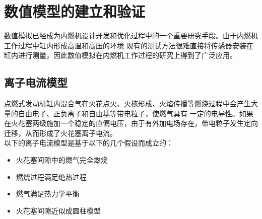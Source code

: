 \chapter{数值模型的建立和验证}
数值模拟已经成为内燃机设计开发和优化过程中的一个重要研究手段。由于内燃机工作过程中缸内形成高温和高压的环境
现有的测试方法很难直接将传感器安装在缸内进行测量，因此数值模拟在内燃机工作过程的研究上得到了广泛应用。
\section{离子电流模型}
点燃式发动机缸内混合气在火花点火、火核形成、火焰传播等燃烧过程中会产生大量的自由电子、正负离子和自由基等带电粒子，使燃气具有
一定的电导性。如果在火花塞两级施加一个稳定的直偏电压，由于有外加电场存在，带电粒子发生定向迁移，从而形成了火花塞离子电流。\\
以下的离子电流模型是基于以下的几个假设而成立的：
\begin{itemize}
\item 火花塞间隙中的燃气完全燃烧
\item 燃烧过程满足绝热过程
\item 燃气满足热力学平衡
\item 火花塞间隙近似成圆柱模型
\end{itemize}
